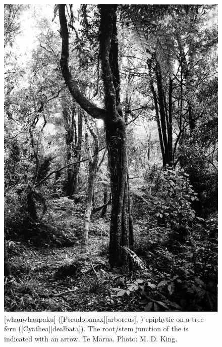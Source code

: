 \begin{figure}[t]
	\begin{minipage}[t]{\textwidth}
		\begin{minipage}[t]{(\textwidth-\fgap) * \real{0.515}}
			\centering
			\includegraphics[width=\textwidth]{graphics/figure55fivefinger.jpg}
			\caption[Whauwhaupaku epiphytic on a tree fern]{[whauwhaupaku] ([Pseudopanax][arboreus], ) epiphytic on a tree fern ([dealbata]). The root/stem junction of the  is indicated with an arrow. Te Marua. Photo:  M. D. King.}%
			\label{fig:55fivefinger}
		\end{minipage}\hspace{\fgap}%

\end{minipage}
\end{figure}
